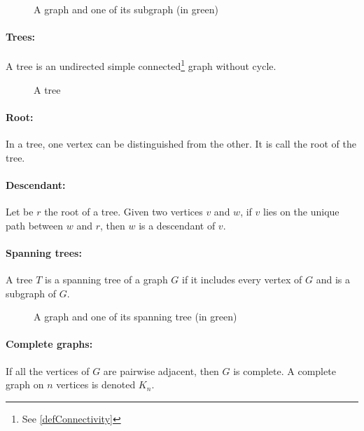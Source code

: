 \begin{figure}[!h]
  \caption{A graph and one of its subgraph (in green)}
  \begin{center}
    
  \end{center}
\end{figure}

\paragraph{Trees:}
A tree is an undirected simple connected\footnote{See \ref{defConnectivity}}
graph without cycle.

\begin{figure}[!h]
  \caption{A tree}
  \begin{center}
    
  \end{center}
\end{figure}

\paragraph{Root:}
In a tree, one vertex can be distinguished from the other. It is call the root
of the tree.

\paragraph{Descendant:}
Let be $r$ the root of a tree.
Given two vertices $v$ and $w$, if $v$ lies on the unique path between $w$ and 
$r$, then $w$ is a descendant of $v$.

\paragraph{Spanning trees:}
A tree $T$ is a spanning tree of a graph $G$ if it includes every vertex of $G$ 
and is a subgraph of $G$.

\begin{figure}[!h]
  \caption{A graph and one of its spanning tree (in green)}
  \begin{center}
    
  \end{center}
\end{figure}

\paragraph{Complete graphs:}
If all the vertices of $G$ are pairwise adjacent, then $G$ is complete. A
complete graph on $n$ vertices is denoted $K_n$.

